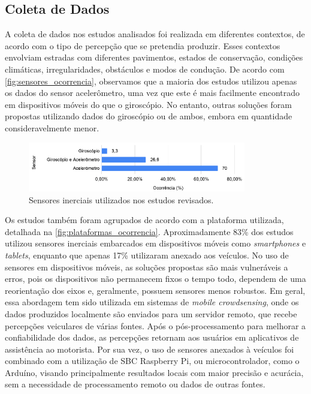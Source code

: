 \subsection{Coleta de Dados}

A coleta de dados nos estudos analisados foi realizada em diferentes contextos, de acordo com o tipo de percepção que se pretendia produzir. Esses contextos envolviam estradas com diferentes pavimentos, estados de conservação, condições climáticas, irregularidades, obstáculos e modos de condução. De acordo com \autoref{fig:sensores_ocorrencia}, observamos que a maioria dos estudos utilizou apenas os dados do sensor acelerômetro, uma vez que este é mais facilmente encontrado em dispositivos móveis do que o giroscópio. No entanto, outras soluções foram propostas utilizando dados do giroscópio ou de ambos, embora em quantidade consideravelmente menor.

\begin{figure}[h!]
  \centering
  \caption{Sensores inerciais utilizados nos estudos revisados.}
   \label{fig:sensores_ocorrencia}
   \includegraphics[width=0.85\textwidth]{figuras/fig_14.png}
\end{figure}

Os estudos também foram agrupados de acordo com a plataforma utilizada, detalhada na \autoref{fig:plataformas_ocorrencia}. Aproximadamente 83\% dos estudos utilizou sensores inerciais embarcados em dispositivos móveis como \textit{smartphones} e \textit{tablets}, enquanto que apenas 17\% utilizaram anexado aos veículos. No uso de sensores em dispositivos móveis, as soluções propostas são mais vulneráveis a erros, pois os dispositivos não permanecem fixos o tempo todo, dependem de uma reorientação dos eixos e, geralmente, possuem sensores menos robustos. Em geral, essa abordagem tem sido utilizada em sistemas de \textit{mobile crowdsensing}, onde os dados produzidos localmente são enviados para um servidor remoto, que recebe percepções veiculares de várias fontes. Após o pós-processamento para melhorar a confiabilidade dos dados, as percepções retornam aos usuários em aplicativos de assistência ao motorista. Por sua vez, o uso de sensores anexados à veículos foi combinado com a utilização de SBC Raspberry Pi, ou microcontrolador, como o Arduíno, visando principalmente resultados locais com maior precisão e acurácia, sem a necessidade de processamento remoto ou dados de outras fontes.

